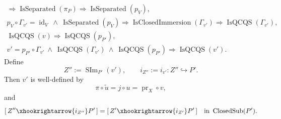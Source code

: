 \begin{lemma}
\[\begin{gathered}
      \Longrightarrow \operatorname{IsSeparated}(\pi_P)
      \Longrightarrow \operatorname{IsSeparated}(p_V),\\
    p_V\circ\Gamma_{v'}=\operatorname{id}_V
      \ \wedge\ \operatorname{IsSeparated}(p_V)
      \Longrightarrow
      \operatorname{IsClosedImmersion}(\Gamma_{v'})
      \Longrightarrow\operatorname{IsQCQS}(\Gamma_{v'}),\\
    \operatorname{IsQCQS}(v)
      \Longrightarrow\operatorname{IsQCQS}(p_{P'}),\\
    v'=p_{P'}\circ\Gamma_{v'}
      \ \wedge\ \operatorname{IsQCQS}(\Gamma_{v'})
      \ \wedge\ \operatorname{IsQCQS}(p_{P'})
      \Longrightarrow\operatorname{IsQCQS}(v').
  \end{gathered}                                                   \tag{SI1}
  \]
  Define
  \[
    Z'':=\operatorname{SIm}_{P'}(v'),\qquad
    i_{Z''}:=i_{v'}\colon Z''\hookrightarrow P'.                  \tag{SI2}
  \]
  Then $v'$ is well-defined by
  \[
    \pi\circ\widetilde u=j\circ u
      =\operatorname{pr}_X\circ v,
  \]
  and
  \[
    [\,Z''\xhookrightarrow{i_{Z''}}P'\,]
      =[\,Z'\xhookrightarrow{i_{Z'}}P'\,]
      \quad\text{in }\operatorname{ClosedSub}(P').
  \]
\end{lemma}

